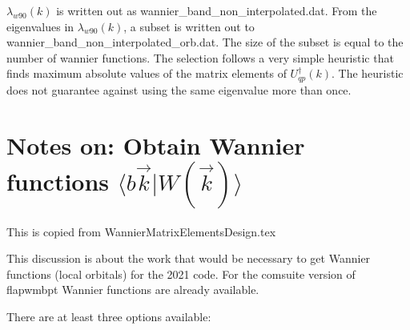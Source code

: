 \documentclass[aps,prb,singlecolumn,preprintnumbers,amsmath,amssymb]{revtex4}
\begin{document}
$\lambda_{w90}(k)$ is written out as wannier\_band\_non\_interpolated.dat.  From the eigenvalues in $\lambda_{w90}(k)$, a subset is written out to wannier\_band\_non\_interpolated\_orb.dat. The size of the subset is equal to the number of wannier functions.  The selection follows a very simple heuristic that finds maximum absolute values of  the matrix elements of $U_{qp}^\dagger(k)$.  The heuristic does not guarantee against using the same eigenvalue more than once.



        
%
%

\section{Notes on: Obtain Wannier functions $\langle b \vec{k} |W(\vec{k})\rangle$ }
This is copied from WannierMatrixElementsDesign.tex

This discussion is about the work that would be necessary to get Wannier functions (local orbitals) for the 2021 code.  For the comsuite version of flapwmbpt Wannier functions are already available.

There are at least three options available:
\end{document}
